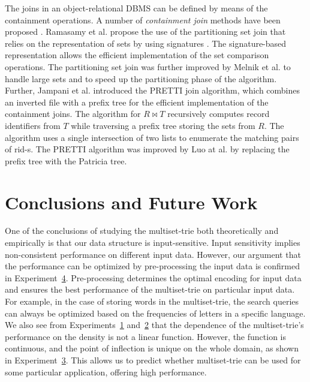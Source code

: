 \documentclass[algorithms,article,accept,pdftex,moreauthors]{Definitions/mdpi}
\begin{document}
The joins in an object-relational DBMS can be defined by means of the containment operations. A number of \emph{containment join} methods have been proposed \cite{Ramasamy2000,Melnik2003,Jampani2005,Luo2015}. Ramasamy et al. propose the use of the partitioning set join that relies on the representation of sets by using signatures \cite{Ramasamy2000}. The signature-based representation allows the efficient implementation of the set comparison operations. The partitioning set join was further improved by Melnik et al. \cite{Melnik2003} to handle large sets and to speed up the partitioning phase of the algorithm. Further, Jampani et al. introduced the PRETTI join algorithm, which combines an inverted file with a prefix tree for the efficient implementation of the containment joins. The algorithm for $R\bowtie T$ recursively computes record identifiers from $T$ while traversing a prefix tree storing the sets from $R$. The algorithm uses a single intersection of two lists to enumerate the matching pairs of rid-s. The PRETTI algorithm was improved by Luo at al. \cite{Luo2015} by replacing the prefix tree with the Patricia tree. 

%
\section{Conclusions and Future Work} \label{c:conclusions}

%
One of the conclusions of studying the multiset-trie both theoretically and empirically is that our data structure is input-sensitive. Input sensitivity implies non-consistent performance on different input data. However, our argument that the performance can be optimized by pre-processing the input data is confirmed in  Experiment~\hyperref[ss:exp3]{4}. Pre-processing determines the optimal encoding for input data and ensures the best performance of the multiset-trie on particular input data. For example, in the case of storing words in the multiset-trie, the search queries can always be optimized based on the frequencies of letters in a specific language. We also see from Experiments~\hyperref[s:exp1]{1} and~\hyperref[s:exp2]{2} that the dependence of the multiset-trie's performance on the density is not a linear function. However, the function is continuous, and the point of inflection is unique on the whole domain, as shown in Experiment~\hyperref[s:exp3]{3}. This allows us to predict whether multiset-trie can be used for some particular application, offering high performance. 
\end{document}
